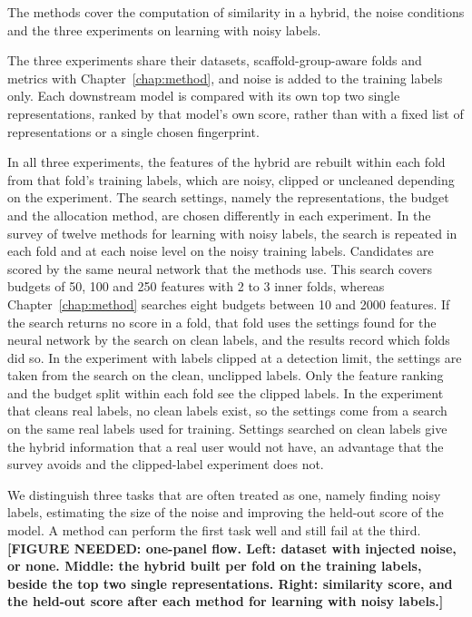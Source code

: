 The methods cover the computation of similarity in a hybrid, the noise conditions and the three experiments on learning with noisy labels.

The three experiments share their datasets, scaffold-group-aware folds and metrics with Chapter~\ref{chap:method}, and noise is added to the training labels only. Each downstream model is compared with its own top two single representations, ranked by that model's own score, rather than with a fixed list of representations or a single chosen fingerprint.

In all three experiments, the features of the hybrid are rebuilt within each fold from that fold's training labels, which are noisy, clipped or uncleaned depending on the experiment. The search settings, namely the representations, the budget and the allocation method, are chosen differently in each experiment. In the survey of twelve methods for learning with noisy labels, the search is repeated in each fold and at each noise level on the noisy training labels. Candidates are scored by the same neural network that the methods use. This search covers budgets of 50, 100 and 250 features with 2 to 3 inner folds, whereas Chapter~\ref{chap:method} searches eight budgets between 10 and 2000 features. If the search returns no score in a fold, that fold uses the settings found for the neural network by the search on clean labels, and the results record which folds did so. In the experiment with labels clipped at a detection limit, the settings are taken from the search on the clean, unclipped labels. Only the feature ranking and the budget split within each fold see the clipped labels. In the experiment that cleans real labels, no clean labels exist, so the settings come from a search on the same real labels used for training. Settings searched on clean labels give the hybrid information that a real user would not have, an advantage that the survey avoids and the clipped-label experiment does not.

We distinguish three tasks that are often treated as one, namely finding noisy labels, estimating the size of the noise and improving the held-out score of the model. A method can perform the first task well and still fail at the third. \textbf{[FIGURE NEEDED: one-panel flow. Left: dataset with injected noise, or none. Middle: the hybrid built per fold on the training labels, beside the top two single representations. Right: similarity score, and the held-out score after each method for learning with noisy labels.]}




